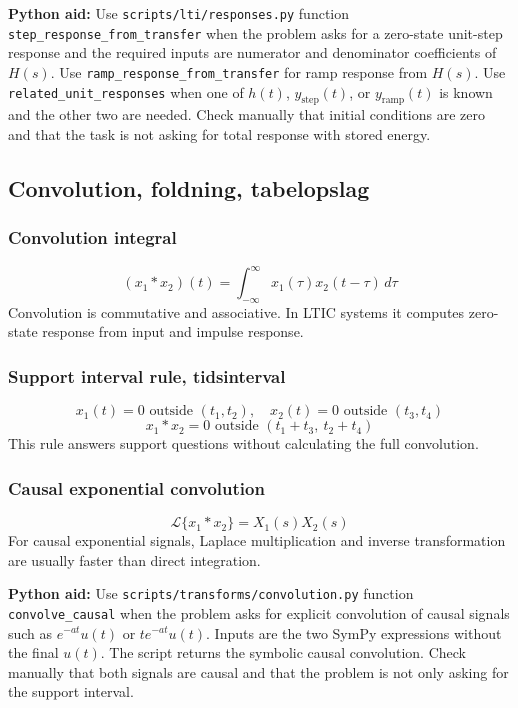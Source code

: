 \textbf{Python aid:} Use \texttt{scripts/lti/responses.py} function \texttt{step\_response\_from\_transfer} when the problem asks for a zero-state unit-step response and the required inputs are numerator and denominator coefficients of \(H(s)\). Use \texttt{ramp\_response\_from\_transfer} for ramp response from \(H(s)\). Use \texttt{related\_unit\_responses} when one of \(h(t)\), \(y_{\mathrm{step}}(t)\), or \(y_{\mathrm{ramp}}(t)\) is known and the other two are needed. Check manually that initial conditions are zero and that the task is not asking for total response with stored energy.

\subsection{Convolution, foldning, tabelopslag}

\subsubsection{Convolution integral}
\[
(x_1*x_2)(t)=\int_{-\infty}^{\infty}x_1(\tau)x_2(t-\tau)\,d\tau
\]
Convolution is commutative and associative. In LTIC systems it computes zero-state response from input and impulse response.

\subsubsection{Support interval rule, tidsinterval}
\[
x_1(t)=0\text{ outside }(t_1,t_2),\quad x_2(t)=0\text{ outside }(t_3,t_4)
\]
\[
x_1*x_2=0\text{ outside }(t_1+t_3,\ t_2+t_4)
\]
This rule answers support questions without calculating the full convolution.

\subsubsection{Causal exponential convolution}
\[
\mathcal{L}\{x_1*x_2\}=X_1(s)X_2(s)
\]
For causal exponential signals, Laplace multiplication and inverse transformation are usually faster than direct integration.

\textbf{Python aid:} Use \texttt{scripts/transforms/convolution.py} function \texttt{convolve\_causal} when the problem asks for explicit convolution of causal signals such as \(e^{-at}u(t)\) or \(t e^{-at}u(t)\). Inputs are the two SymPy expressions without the final \(u(t)\). The script returns the symbolic causal convolution. Check manually that both signals are causal and that the problem is not only asking for the support interval.

